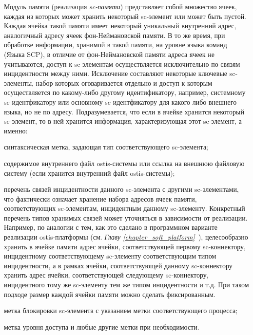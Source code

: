\begin{textitemize}
	\item Модуль памяти (реализация \textit{sc-памяти}) представляет собой множество ячеек, каждая из которых может хранить некоторый sc-элемент или может быть пустой. Каждая ячейка такой памяти имеет некоторый уникальный внутренний адрес, аналогичный адресу ячеек фон-Неймановской памяти. В то же время, при обработке информации, хранимой в такой памяти, на уровне языка команд (Языка SCP), в отличие от фон-Неймановской памяти адреса ячеек не учитываются, доступ к sc-элементам осуществляется исключительно по связям инцидентности между ними. Исключение составляют некоторые ключевые sc-элементы, набор которых оговаривается отдельно и доступ к которым осуществляется по какому-либо другому идентификатору, например, системному sc-идентфикатору или основному sc-идентфикатору для какого-либо внешнего языка, но не по адресу. 
	Подразумевается, что если в ячейке хранится некоторый sc-элемент, то в ней хранится информация, характеризующая этот sc-элемент, а именно:
	\begin{textitemize}
		\item синтаксическая метка, задающая тип соответствующего sc-элемента;
		\item содержимое внутреннего файл ostis-системы или ссылка на внешнюю файловую систему (если хранится внутренний файл ostis-системы);
		\item перечень связей инцидентности данного sc-элемента с другими sc-элементами, что фактически означает хранение набора адресов ячеек памяти, соответствующих sc-элементам, инцидентным данному sc-элементу. Конкретный перечень типов хранимых связей может уточняться в зависимости от реализации. Например, по аналогии с тем, как это сделано в программном варианте реализации ostis-платформы (см. \textit{Главу \ref{chapter_soft_platform}~}), целесообразно хранить в ячейке памяти адрес ячейки, соответствующей первому sc-коннектору, инцидентному соответствующему sc-элементу соответствующим типом инцидентности, а в рамках ячейки, соответствующей данному sc-коннектору хранить адрес ячейки, соответствующей следующему sc-коннектору, инцидентного тому же sc-элементу тем же типом инцидентности и т.д. При таком подходе размер каждой ячейки памяти можно сделать фиксированным.
		\item метка блокировки sc-элемента с указанием метки соответствующего процесса;
		\item метка уровня доступа и любые другие метки при необходимости.
	\end{textitemize}

\end{textitemize}
